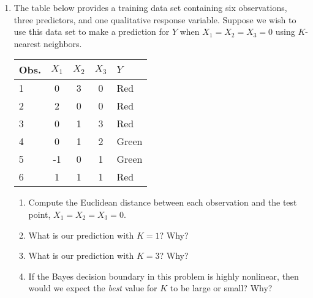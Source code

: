 \documentclass[12pt]{article}
\begin{document}
\begin{enumerate}
\item The table below provides a training data set containing six observations,
      three predictors, and one qualitative response variable. Suppose we wish
      to use this data set to make a prediction for $Y$ when $X_1 = X_2 = X_3 = 0$
      using $K$-nearest neighbors.

      \vspace{-1em}

      \begin{table}[h!]
        \begin{center}
          \begin{tabular}{l|cccl}
            Obs. & $X_1$ & $X_2$ & $X_3$ & $Y$ \\
            \hline
            1 & 0   & 3 & 0 & Red\\
            2 & 2   & 0 & 0 & Red\\
            3 & 0   & 1 & 3 & Red\\
            4 & 0   & 1 & 2 & Green\\
            5 & -1  & 0 & 1 & Green\\
            6 & 1   & 1 & 1 & Red
          \end{tabular}
        \end{center}
      \end{table}

      \vspace{-3em}

  \begin{enumerate}
    \item Compute the Euclidean distance between each observation and the test
          point, $X_1 = X_2 = X_3 = 0$.
    \item What is our prediction with $K = 1$? Why?
    \item What is our prediction with $K = 3$? Why?
    \item If the Bayes decision boundary in this problem is highly nonlinear,
          then would we expect the \textit{best} value for $K$ to be large or
          small? Why?
  \end{enumerate}

\end{enumerate}
\end{document}
